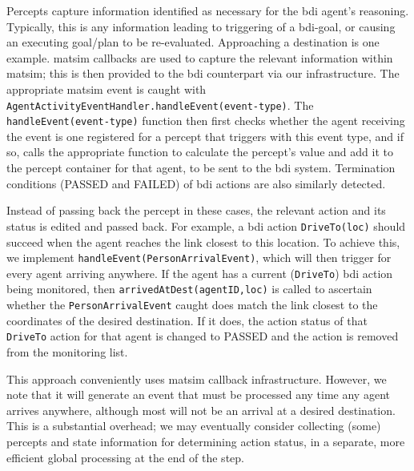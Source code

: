 Percepts capture information identified as
necessary for the \gls{bdi} agent's reasoning. Typically, this is any
information leading to triggering of a \gls{bdi}-goal, or 
causing an executing goal/plan to be re-evaluated. 
Approaching a destination is one example. \gls{matsim} callbacks are used to capture the relevant
information within \gls{matsim}; this is then provided to the \gls{bdi}
counterpart via our infrastructure. The appropriate \gls{matsim} event is
caught with
\\ \lstinline{AgentActivityEventHandler.handleEvent(event-type)}.  The
\lstinline{handleEvent(event-type)} function then first checks whether the
agent receiving the event is one registered for a percept that
triggers with this event type, and if so, calls the appropriate function
to calculate the percept's value and add it to the percept
container for that agent, to be sent to the \gls{bdi} system. Termination
conditions (PASSED and FAILED) of \gls{bdi} actions are also similarly detected.

Instead of passing back the percept in these cases, the relevant
action and its status is edited and passed back.  For example, a \gls{bdi}
action \lstinline{DriveTo(loc)} should succeed when the agent reaches the
link closest to this location. To achieve this, we implement 
\lstinline{handleEvent(PersonArrivalEvent)}, which will then trigger for every
agent arriving anywhere. If the agent has a current (\lstinline{DriveTo})
\gls{bdi} action being monitored, then \lstinline{arrivedAtDest(agentID,loc)} is
called to ascertain whether the \lstinline{PersonArrivalEvent} caught
does match the link closest to the coordinates of the desired
destination. If it does, the action status of that \lstinline{DriveTo} action for
that agent is changed to PASSED and the action is removed from the monitoring
list.

This approach conveniently uses \gls{matsim} callback
infrastructure. However, we note that it will generate an event that
must be processed any time any agent arrives anywhere, although most
will not be an arrival at a desired destination. This is a
substantial overhead; we may eventually consider collecting (some)
percepts and state information for determining action status, in a
separate, more efficient global processing at the end of the step.

